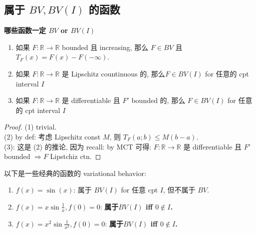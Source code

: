 \documentclass{qlnotes-export}
\begin{document}
\subsection{\texorpdfstring{属于 \(BV,BV(I)\) 的函数}{属于 BV,BV(I) 的函数}}\label{ux5c5eux4e8e-bvbvi-ux7684ux51fdux6570}

\begin{lemma}{\protect{}\label{kn-bv-or-bv-i}{\textbf{哪些函数一定 \(BV\)
or \(BV(I)\)}}}

\begin{enumerate}
\item
  如果 \(F:{\mathbb{R}}\rightarrow{\mathbb{R}}\) bounded 且 increasing, 那么 \(F \in BV\) 且 \(T_{F}(x) = F(x) - F( - \infty)\).\\
\item
  如果 \(F:{\mathbb{R}}\rightarrow{\mathbb{R}}\) 是 Lipschitz countinuous 的, 那么\(F \in BV(I)\) for 任意的 cpt interval \(I\)
\item
  如果 \(F:{\mathbb{R}}\rightarrow{\mathbb{R}}\) 是 differentiable 且 \(F'\) bounded 的, 那么 \(F \in BV(I)\) for 任意的 cpt interval \(I\)
\end{enumerate}

\end{lemma}

\begin{proof}

(1) trivial.\\
(2) by def: 考虑 Lipschitz const \(M\), 则 \(T_{F}(a;b) \leq M(b - a)\).\\
(3): 这是 (2) 的推论, 因为 recall: by MCT 可得: \(F:{\mathbb{R}}\rightarrow{\mathbb{R}}\) 是 differentiable 且 \(F'\) bounded \(\Longrightarrow F\) Lipstchiz ctn.

\end{proof}

\begin{proposition}

以下是一些经典的函数的 variational behavior:

\begin{enumerate}
\item
  \(f(x) = \sin(x)\): 属于 \(BV(I)\) for 任意 cpt \(I\), 但不属于 \(BV\).
\item
  \(f(x) = x\sin\frac{1}{x},f(0) = 0\): \textbf{属于\(BV(I)\) iff \(0 \notin I\).}
\item
  \(f(x) = x^{2}\sin\frac{1}{x^{2}},f(0) = 0\): \textbf{属于\(BV(I)\) iff \(0 \notin I\).}
\end{enumerate}

\end{proposition}
\end{document}
